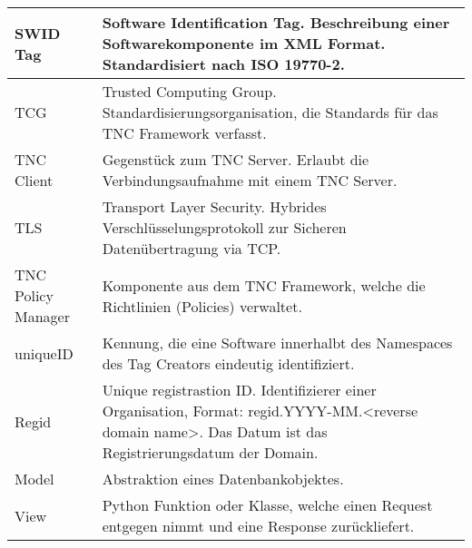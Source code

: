 \begin{tabular}{|l|l|}
\hline
SWID Tag & Software Identification Tag. Beschreibung einer Softwarekomponente im XML Format. Standardisiert nach ISO 19770-2.\\
\hline
TCG & Trusted Computing Group. Standardisierungsorganisation, die Standards für das TNC Framework verfasst.\\
\hline 
TNC Client & Gegenstück zum TNC Server. Erlaubt die Verbindungsaufnahme mit einem TNC Server.\\
\hline
TLS & Transport Layer Security. Hybrides Verschlüsselungsprotokoll zur Sicheren Datenübertragung via TCP.\\
\hline
TNC Policy Manager & Komponente aus dem TNC Framework, welche die Richtlinien (Policies) verwaltet.\\
\hline
uniqueID & Kennung, die eine Software innerhalbt des Namespaces des Tag Creators eindeutig identifiziert.\\
\hline
Regid & Unique registrastion ID. Identifizierer einer Organisation, Format: regid.YYYY-MM.<reverse domain name>. Das Datum ist das Registrierungsdatum der Domain.\\
\hline
Model & Abstraktion eines Datenbankobjektes.\\
\hline
View & Python Funktion oder Klasse, welche einen Request entgegen nimmt und eine Response zurückliefert.\\
\hline


\end{tabular} 